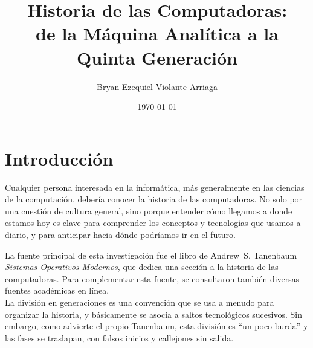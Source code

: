 \documentclass[10pt,letterpaper,twocolumn]{article}
\title{\textbf{\Large Historia de las Computadoras: \\
de la Máquina Analítica a la Quinta Generación}}
\author{Bryan Ezequiel Violante Arriaga}
\date{\small\today}
\begin{document}

\section{Introducción}
Cualquier persona interesada en la informática, más generalmente en las ciencias
de la computación, debería conocer la historia de las computadoras. No solo por 
una cuestión de cultura general, sino porque entender cómo llegamos a donde 
estamos hoy es clave para comprender los conceptos y tecnologías que usamos a 
diario, y para anticipar hacia dónde podríamos ir en el futuro.

La fuente principal de esta investigación fue el libro de Andrew~S. Tanenbaum
\emph{Sistemas Operativos Modernos}, que dedica una sección a la historia de las 
computadoras. Para complementar esta fuente, se consultaron también diversas 
fuentes académicas en línea.  \\
La división en generaciones es una convención que se usa a menudo para organizar 
la historia, y básicamente se asocia a saltos tecnológicos sucesivos. 
Sin embargo, como advierte el propio Tanenbaum, esta división es ``un poco burda'' 
y las fases se traslapan, con falsos inicios y callejones sin salida. 
\end{document}
